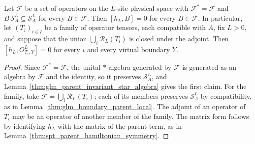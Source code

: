 \begin{lemma}
    \label{thm:glm_boundary_parent_local_family}
    \leanok
    Let $\mathcal F$ be a set of operators on the $L$-site physical space
    with $\mathcal F^*=\mathcal F$ and $B\,\mathcal S_A^L\subseteq\mathcal S_A^L$
    for every $B\in\mathcal F$. Then $[h_L,B]=0$ for every
    $B\in\mathcal F$. In particular, let $(T_i)_{i\in I}$ be a family of
    operator tensors, each compatible with $A$, fix $L>0$, and suppose that
    the union $\bigcup_i\mathcal R_L(T_i)$ is closed under the adjoint.
    Then $[h_L,O^L_{T_i,Y}]=0$ for every $i$ and every virtual
    boundary $Y$.
\end{lemma}
\begin{proof}
    \leanok
    Since $\mathcal F^*=\mathcal F$, the unital $*$-algebra generated by
    $\mathcal F$ is generated as an algebra by $\mathcal F$ and the
    identity, so it preserves $\mathcal S_A^L$, and
    Lemma~\ref{thm:glm_parent_invariant_star_algebra} gives the first
    claim. For the family, take $\mathcal F=\bigcup_i\mathcal R_L(T_i)$;
    each of its members preserves $\mathcal S_A^L$ by compatibility, as in
    Lemma~\ref{thm:glm_boundary_parent_local}. The adjoint of an operator
    of $T_i$ may be an operator of another member of the family. The
    matrix form follows by identifying $h_L$ with the matrix of the
    parent term, as in Lemma~\ref{thm:spt_parent_hamiltonian_symmetry}.
\end{proof}

